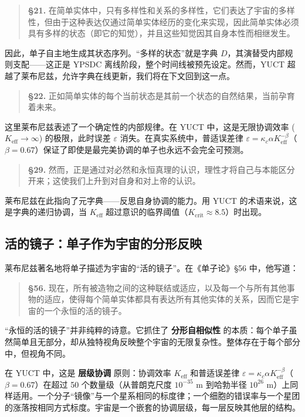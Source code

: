 \documentclass[12pt,a4paper]{article}
\begin{document}
	\begin{quote}
		\textbf{§21.} 在简单实体中，只有多样性和关系的多样性，它们表达了宇宙的多样性，但由于这种表达仅通过简单实体经历的变化来实现，因此简单实体必须具有多样的状态（即它的知觉），并且这些知觉因其自身本性而相继发生。
	\end{quote}
	
	因此，单子自主地生成其状态序列。“多样的状态”就是字典 \(D\)，其演替受内部规则支配——这正是 YPSDC 离线阶段，整个时间线被预先设定。然而，YUCT 超越了莱布尼兹，允许字典在线更新，我们将在下文回到这一点。
	
	\begin{quote}
		\textbf{§22.} 正如简单实体的每个当前状态是其前一个状态的自然结果，当前孕育着未来。
	\end{quote}
	
	这里莱布尼兹表述了一个确定性的内部规律。在 YUCT 中，这是无限协调效率 (\(K_{\mathrm{eff}} \to \infty\)) 的极限，此时误差 \(\varepsilon\) 消失。在真实系统中，普适误差律 \(\varepsilon = \kappa_c \alpha K_{\mathrm{eff}}^{-\beta}\)（\(\beta=0.67\)）保证了即使是最完美协调的单子也永远不会完全可预测。
	
	\begin{quote}
		\textbf{§29.} 然而，正是通过对必然和永恒真理的认识，理性才将自己与本能区分开来；这使我们上升到对自身和对上帝的认识。
	\end{quote}
	
	莱布尼兹在此指向了元字典——反思自身协调的能力。用 YUCT 的术语来说，这是字典的递归协调，当 \(K_{\mathrm{eff}}\) 超过意识的临界阈值（\(K_{\mathrm{crit}} \approx 8.5\)）时出现。
	
	\subsection{活的镜子：单子作为宇宙的分形反映}
	
	莱布尼兹著名地将单子描述为宇宙的“活的镜子”。在《单子论》§56 中，他写道：
	
	\begin{quote}
		\textbf{§56.} 现在，所有被造物之间的这种联结或适应，以及每一个与所有其他事物的适应，使得每个简单实体都具有表达所有其他实体的关系，因而它是宇宙的一个永恒的活的镜子。
	\end{quote}
	
	“永恒的活的镜子”并非纯粹的诗意。它抓住了 \textbf{分形自相似性} 的本质：每个单子虽然简单且无部分，却从独特视角反映整个宇宙的无限复杂性。整体存在于每个部分中，但视角不同。
	
	在 YUCT 中，这是 \textbf{层级协调} 原则：协调效率 \(K_{\mathrm{eff}}\) 和普适误差律 \(\varepsilon = \kappa_c \alpha K_{\mathrm{eff}}^{-\beta}\)（\(\beta=0.67\)）在超过 50 个数量级（从普朗克尺度 \(10^{-35}\) m 到哈勃半径 \(10^{26}\) m）上同样适用。一个分子“镜像”与一个星系相同的标度律；一个细胞的错误率与一个星团的涨落按相同方式标度。宇宙是一个嵌套的协调层级，每一层反映其他层的结构。
	
\end{document}

